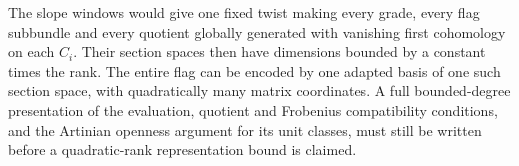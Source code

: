 \begin{remark}
The slope windows would give one fixed twist making
every grade, every flag subbundle and every quotient
globally generated with vanishing first cohomology
on each $C_i$.  Their section spaces then have
dimensions bounded by a constant times the rank.
The entire flag can be encoded by one adapted basis
of one such section space, with quadratically many
matrix coordinates.  A full bounded-degree
presentation of the evaluation, quotient and
Frobenius compatibility conditions, and the
Artinian openness argument for its unit classes,
must still be written before a quadratic-rank
representation bound is claimed.
\end{remark}
